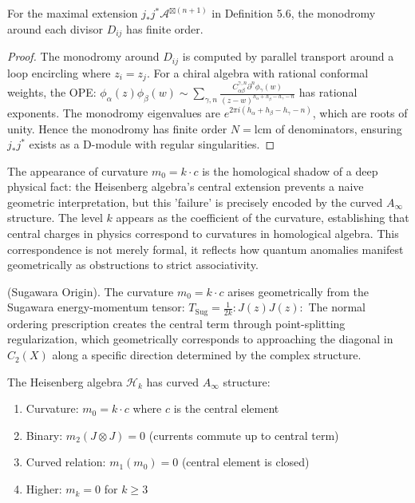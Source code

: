 \begin{theorem}\label{thm:monodromy-finite}
For the maximal extension $j_*j^*\mathcal{A}^{\boxtimes(n+1)}$ in Definition 5.6, the monodromy around each divisor $D_{ij}$ has finite order.
\end{theorem}

\begin{proof}
The monodromy around $D_{ij}$ is computed by parallel transport around a loop encircling where $z_i = z_j$. For a chiral algebra with rational conformal weights, the OPE:
$\phi_\alpha(z)\phi_\beta(w) \sim \sum_{\gamma,n} \frac{C^{\gamma,n}_{\alpha\beta}\partial^n\phi_\gamma(w)}{(z-w)^{h_\alpha + h_\beta - h_\gamma - n}}$
has rational exponents. The monodromy eigenvalues are $e^{2\pi i(h_\alpha + h_\beta - h_\gamma - n)}$, which are roots of unity. Hence the monodromy has finite order $N = \text{lcm}$ of denominators, ensuring $j_*j^*$ exists as a D-module with regular singularities.
\end{proof}

\begin{remark}
The appearance of curvature $m_0 = k \cdot c$ is the homological shadow of a deep physical fact: the Heisenberg algebra's central extension prevents a naive geometric interpretation, but this 'failure' is precisely encoded by the curved $A_\infty$ structure. The level $k$ appears as the coefficient of the curvature, establishing that central charges in physics correspond to curvatures in homological algebra. This correspondence is not merely formal, it reflects how quantum anomalies manifest geometrically as obstructions to strict associativity.
\end{remark}

\begin{remark} (Sugawara Origin). The curvature $m_0 = k \cdot c$ arises geometrically from the Sugawara energy-momentum tensor:
$T_{\text{Sug}} = \frac{1}{2k} :J(z)J(z):$
The normal ordering prescription creates the central term through point-splitting regularization, which geometrically corresponds to approaching the diagonal in $C_2(X)$ along a specific direction determined by the complex structure.
\end{remark}

\begin{theorem}
The Heisenberg algebra $\mathcal{H}_k$ has curved $A_\infty$ structure:
\begin{enumerate}
\item Curvature: $m_0 = k \cdot c$ where $c$ is the central element
\item Binary: $m_2(J \otimes J) = 0$ (currents commute up to central term)
\item Curved relation: $m_1(m_0) = 0$ (central element is closed)
\item Higher: $m_k = 0$ for $k \geq 3$ 
\end{enumerate}
\end{theorem}

